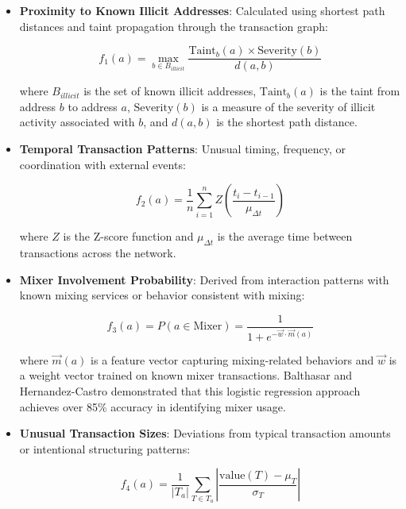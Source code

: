 \documentclass[conference]{IEEEtran}
\begin{document}
\begin{itemize}
    \item \textbf{Proximity to Known Illicit Addresses}: Calculated using shortest path distances and taint propagation through the transaction graph:
    
    \begin{equation}
    f_1(a) = \max_{b \in B_{illicit}} \frac{\text{Taint}_b(a) \times \text{Severity}(b)}{d(a,b)}
    \end{equation}
    
    where $B_{illicit}$ is the set of known illicit addresses, $\text{Taint}_b(a)$ is the taint from address $b$ to address $a$, $\text{Severity}(b)$ is a measure of the severity of illicit activity associated with $b$, and $d(a,b)$ is the shortest path distance.
    
    \item \textbf{Temporal Transaction Patterns}: Unusual timing, frequency, or coordination with external events:
    
    \begin{equation}
    f_2(a) = \frac{1}{n} \sum_{i=1}^{n} Z\left(\frac{t_i - t_{i-1}}{\mu_{\Delta t}}\right)
    \end{equation}
    
    where $Z$ is the Z-score function and $\mu_{\Delta t}$ is the average time between transactions across the network.
    
    \item \textbf{Mixer Involvement Probability}: Derived from interaction patterns with known mixing services or behavior consistent with mixing:
    
    \begin{equation}
    f_3(a) = P(a \in \text{Mixer}) = \frac{1}{1 + e^{-\vec{w} \cdot \vec{m}(a)}}
    \end{equation}
    
    where $\vec{m}(a)$ is a feature vector capturing mixing-related behaviors and $\vec{w}$ is a weight vector trained on known mixer transactions. Balthasar and Hernandez-Castro \cite{balthasar2017} demonstrated that this logistic regression approach achieves over 85\% accuracy in identifying mixer usage.
    
    \item \textbf{Unusual Transaction Sizes}: Deviations from typical transaction amounts or intentional structuring patterns:
    
    \begin{equation}
    f_4(a) = \frac{1}{|T_a|} \sum_{T \in T_a} \left|\frac{\text{value}(T) - \mu_T}{\sigma_T}\right|
    \end{equation}
    

\end{itemize}
\end{document}
